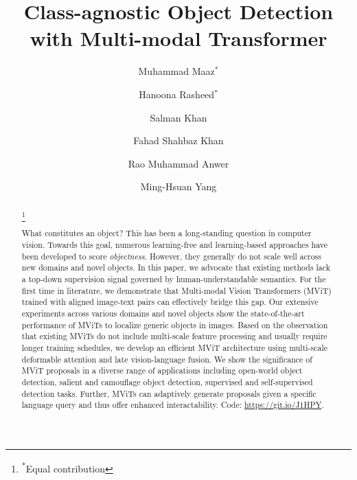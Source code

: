 \documentclass[runningheads]{llncs}
\newcommand\blfootnote[1]{\begingroup
  \renewcommand\thefootnote{}\footnote{#1}\addtocounter{footnote}{-1}\endgroup
}
\begin{document}
\pagestyle{headings}
\mainmatter
\def\ECCVSubNumber{6491}  

\title{Class-agnostic Object Detection with Multi-modal Transformer} 

\begin{comment}
\titlerunning{ECCV-22 submission ID \ECCVSubNumber} 
\authorrunning{ECCV-22 submission ID \ECCVSubNumber} 
\author{Anonymous ECCV submission}
\institute{Paper ID \ECCVSubNumber}
\end{comment}


\author{
Muhammad Maaz$^{*}$ \and
Hanoona Rasheed$^{*}$ \and
Salman Khan \and
Fahad Shahbaz Khan \and
Rao Muhammad Anwer \and
Ming-Hsuan Yang
}
\maketitle

\begin{abstract}
\blfootnote{\textsuperscript{*}Equal contribution}
What constitutes an object? This has been a long-standing question in computer vision. Towards this goal, numerous learning-free and learning-based approaches have been developed to score \emph{objectness}. However, they generally do not scale well across new domains and novel objects. In this paper, we advocate that existing methods lack a top-down supervision signal governed by human-understandable semantics. For the first time in literature, we demonstrate that Multi-modal Vision Transformers (MViT) trained with aligned image-text pairs can effectively bridge this gap. Our extensive experiments across various domains and novel objects show the state-of-the-art performance of MViTs to localize generic objects in images. Based on the observation that existing MViTs do not include multi-scale feature processing and usually require longer training schedules, we develop an efficient MViT architecture using multi-scale deformable attention and late vision-language fusion. We show the significance of MViT proposals in a diverse range of applications including open-world object detection, salient and camouflage object detection, supervised and self-supervised detection tasks. Further, MViTs can adaptively generate proposals given a  specific language query and thus offer enhanced interactability. Code: \url{https://git.io/J1HPY}.

\end{abstract}
\end{document}
